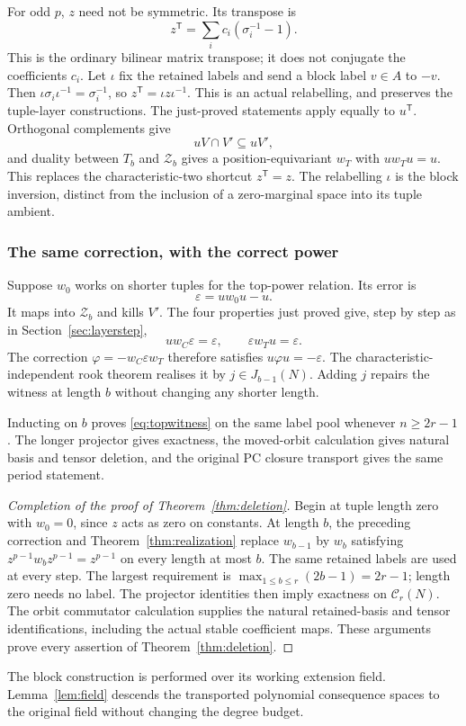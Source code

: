 \documentclass[11pt,a4paper]{article}
\theoremstyle{definition}\newtheorem{definition}[theorem]{Definition}
\theoremstyle{remark}\newtheorem{remark}[theorem]{Remark}
\begin{document}
For odd $p$, $z$ need not be symmetric. Its transpose is
\[z^{\mathsf T}=\sum_i c_i(\sigma_i^{-1}-1).
\]
This is the ordinary bilinear matrix transpose; it does not conjugate
the coefficients $c_i$.
Let $\iota$ fix the retained labels and send a block label $v\in A$ to $-v$. Then $\iota\sigma_i\iota^{-1}=\sigma_i^{-1}$, so $z^{\mathsf T}=\iota z\iota^{-1}$. This is an actual relabelling, and preserves the tuple-layer constructions. The just-proved statements apply equally to $u^{\mathsf T}$. Orthogonal complements give
\[uV\cap V'\subseteq uV',
\]
and duality between $T_b$ and $\mathcal Z_b$ gives a position-equivariant $w_T$ with $uw_Tu=u$. This replaces the characteristic-two shortcut $z^{\mathsf T}=z$.
The relabelling $\iota$ is the block inversion, distinct from the
inclusion of a zero-marginal space into its tuple ambient.

\subsubsection{The same correction, with the correct power}
Suppose $w_0$ works on shorter tuples for the top-power relation. Its error is
\[\varepsilon=uw_0u-u.
\]
It maps into $\mathcal Z_b$ and kills $V'$. The four properties just proved give, step by step as in Section~\ref{sec:layerstep},
\[uw_C\varepsilon=\varepsilon,\qquad\varepsilon w_Tu=\varepsilon.
\]
The correction $\varphi=-w_C\varepsilon w_T$ therefore satisfies $u\varphi u=-\varepsilon$. The characteristic-independent rook theorem realises it by $j\in J_{b-1}(N)$. Adding $j$ repairs the witness at length $b$ without changing any shorter length.

Inducting on $b$ proves \eqref{eq:topwitness} on the same label pool whenever $n\ge2r-1$. The longer projector gives exactness, the moved-orbit calculation gives natural basis and tensor deletion, and the original PC closure transport gives the same period statement.


\begin{proof}[Completion of the proof of Theorem~\ref{thm:deletion}]
Begin at tuple length zero with $w_0=0$, since $z$ acts as zero on
constants. At length $b$, the preceding correction and
Theorem~\ref{thm:realization} replace $w_{b-1}$ by $w_b$ satisfying
$z^{p-1}w_bz^{p-1}=z^{p-1}$ on every length at most $b$. The same
retained labels are used at every step. The largest requirement is
$\max_{1\le b\le r}(2b-1)=2r-1$; length zero needs no label.
The projector identities then imply exactness on $\mathcal C_r(N)$.
The orbit commutator calculation supplies the natural retained-basis
and tensor identifications, including the actual stable coefficient
maps. These arguments prove every assertion of Theorem~\ref{thm:deletion}.
\end{proof}
The block construction is performed over its working extension field.
Lemma~\ref{lem:field} descends the transported polynomial consequence
spaces to the original field without changing the degree budget.
\end{document}
